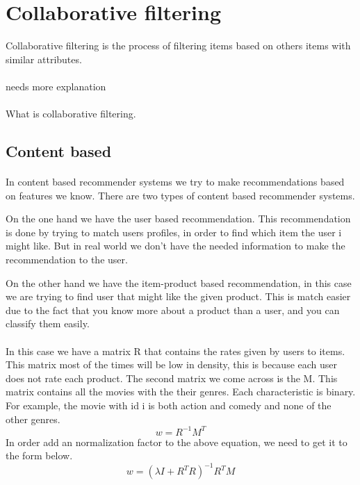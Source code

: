 \newpage
\section{Collaborative filtering}
Collaborative filtering is the process of filtering items based on others items with similar attributes.
\\\\needs more explanation\\\\
What is collaborative filtering.
\cite{RecommenderSystems:2}
\subsection{Content based}

\paragraph{}In content based recommender systems we try to make recommendations based on features we know. There are two types of content based recommender systems. 

On the one hand we have the user based recommendation. This recommendation is done by trying to match users profiles, in order to find which item the user i might like. But in real world we don't have the needed information to make the recommendation to the user. 

On the other hand we have the item-product based recommendation, in this case we are trying to find user that might like the given product. This is match easier due to the fact that you know more about a product than a user, and you can classify them easily.

\paragraph{}In this case we have a matrix R that contains the rates given by users to items. This matrix most of the times will be low in density, this is because each user does not rate each product. The second matrix we come across is the M. This matrix contains all the movies with the their genres. Each characteristic is binary. For example, the movie with id i is both action and comedy and none of the other genres.
\begin{equation}
 w=R^{-1}M^{T}
\end{equation}
In order add an normalization factor to the above equation, we need to get it to the form below.
\begin{equation}
 w=(\lambda I + R^{T}R)^{-1} R^{T}M 
\end{equation}

